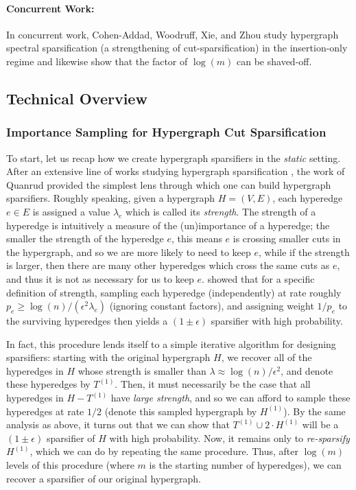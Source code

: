 \documentclass[11pt]{article}
\theoremstyle{definition}
\newcommand{\eps}{\epsilon}
\begin{document}
\paragraph{Concurrent Work:} In concurrent work, Cohen-Addad, Woodruff, Xie, and Zhou \cite{CWXZ25} study hypergraph spectral sparsification (a strengthening of cut-sparsification) in the insertion-only regime and likewise show that the factor of $\log(m)$ can be shaved-off.

\subsection{Technical Overview}

\subsubsection{Importance Sampling for Hypergraph Cut Sparsification}\label{sec:importanceSampling}

To start, let us recap how we create hypergraph sparsifiers in the \emph{static} setting. After an extensive line of works studying hypergraph sparsification \cite{KK15, SY19, CKN20, KKTY21a, KKTY21b, JLS22, Lee23, KPS24}, the work of Quanrud \cite{Qua23} provided the simplest lens through which one can build hypergraph sparsifiers. Roughly speaking, given a hypergraph $H = (V, E)$, each hyperedge $e \in E$ is assigned a value $\lambda_e$ which is called its \emph{strength}. The strength of a hyperedge is intuitively a measure of the (un)importance of a hyperedge; the smaller the strength of the hyperedge $e$, this means $e$ is crossing smaller cuts in the hypergraph, and so we are more likely to need to keep $e$, while if the strength is larger, then there are many other hyperedges which cross the same cuts as $e$, and thus it is not as necessary for us to keep $e$. \cite{Qua23} showed that for a specific definition of strength, sampling each hyperedge (independently) at rate roughly $p_e \geq \log(n) / (\eps^2 \lambda_e)$ (ignoring constant factors), and assigning weight $1 / p_e$ to the surviving hyperedges then yields a $(1 \pm \eps)$ sparsifier with high probability. 

In fact, this procedure lends itself to a simple iterative algorithm for designing sparsifiers: starting with the original hypergraph $H$, we recover all of the hyperedges in $H$ whose strength is smaller than $\lambda \approx \log(n) / \eps^2$, and denote these hyperedges by $T^{(1)}$. Then, it must necessarily be the case that all hyperedges in $H - T^{(1)}$ have \emph{large strength}, and so we can afford to sample these hyperedges at rate $1/2$ (denote this sampled hypergraph by $H^{(1)}$). By the same analysis as above, it turns out that we can show that $T^{(1)} \cup 2 \cdot H^{(1)}$ will be a $(1 \pm \eps)$ sparsifier of $H$ with high probability. Now, it remains only to \emph{re-sparsify} $H^{(1)}$, which we can do by repeating the same procedure. Thus, after $\log(m)$ levels of this procedure (where $m$ is the starting number of hyperedges), we can recover a sparsifier of our original hypergraph. 
\end{document}
